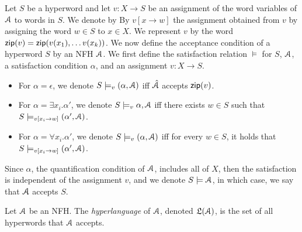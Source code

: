 
Let $S$ be a hyperword and let $v: X\rightarrow S$ be an assignment of the word 
variables of $\mathcal{A}$ to words in $S$. We denote by By $v[x\rightarrow w]$ the assignment obtained from $v$ by assigning the word $w\in S$ to $x\in X$. We represent $v$ by the word $\mathsf{zip}(v) = \mathsf{zip}(v(x_1),\ldots v(x_k))$.  
%
We now define the acceptance condition of a hyperword $S$ by an NFH $\mathcal{A}$. We 
first define the satisfaction relation $\models$ for $S$, $\mathcal{A}$, a satisfaction condition $\alpha$, and an assignment $v:X\rightarrow S$.

\begin{itemize}
    \item For $\alpha = \epsilon$, we denote $S \models _v (\alpha,\mathcal{A})$ iff 
$\hat{\mathcal{A}}$ accepts $\mathsf{zip}(v)$. 

\item For $\alpha = \exists x_i. \alpha'$, we denote $S\models_v \alpha,\mathcal{A}$ iff 
there exists $w\in S$ such that $S \models_{v[x_i\rightarrow w]}  (\alpha',\mathcal{A})$.

\item For $\alpha = \forall x_i. \alpha'$, we denote $S\models_v (\alpha,\mathcal{A})$ 
iff 
for every $w\in S$, it holds that $S \models_{v[x_i\rightarrow w]}  (\alpha',\mathcal{A})$.

\end{itemize}
%
Since $\alpha$, the quantification condition of $\mathcal{A}$, includes all of $X$, then the satisfaction is independent of the 
assignment $v$, and we denote $S \models \mathcal{A}$, in which case, we say that $\mathcal{A}$ 
accepts $S$.

 

\begin{definition}
Let $\mathcal{A}$ be an NFH. The {\em hyperlanguage} of $\mathcal{A}$, denoted $\mathfrak{L}(\mathcal{A})$, is 
the set of all hyperwords that $\mathcal{A}$ accepts.
\end{definition}


